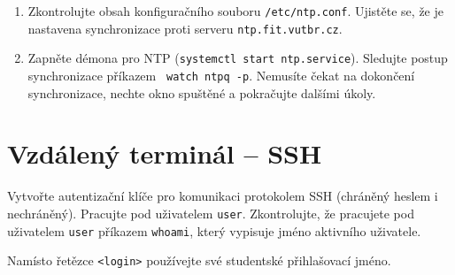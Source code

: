 \begin{enumerate}

  \item Zkontrolujte obsah konfiguračního souboru {\tt /etc/ntp.conf}. Ujistěte
    se, že je nastavena synchronizace proti serveru {\tt ntp.fit.vutbr.cz}.

  \item Zapněte démona pro NTP ({\tt systemctl start ntp.service}).
    Sledujte postup synchronizace příkazem {\tt
    watch ntpq -p}. Nemusíte čekat na dokončení synchronizace, nechte okno
    spuštěné a pokračujte dalšími úkoly.

\end{enumerate}

\section{Vzdálený terminál -- SSH}

Vytvořte autentizační klíče pro komunikaci protokolem SSH (chráněný heslem i
nechráněný). Pracujte pod uživatelem {\tt user}. Zkontrolujte, že pracujete pod
uživatelem {\tt user} příkazem {\tt whoami}, který vypisuje jméno aktivního
uživatele.

Namísto řetězce {\tt <login>} používejte své studentské přihlašovací jméno.

